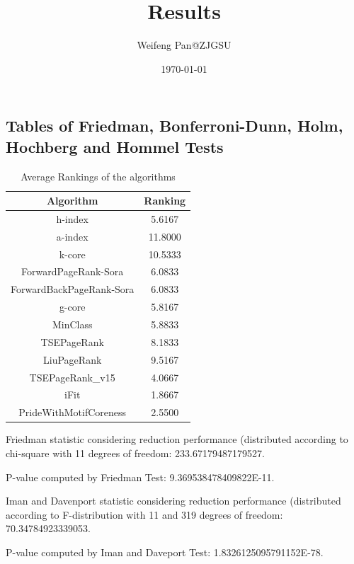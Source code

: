 \documentclass[a4paper,10pt]{article}
\title{Results}
\author{Weifeng Pan@ZJGSU}
\date{\today}
\begin{document}
\begin{landscape}
\oddsidemargin 0in \topmargin 0in\maketitle
\section{Tables of Friedman, Bonferroni-Dunn, Holm, Hochberg and Hommel Tests}
\begin{table}[!htp]
\centering
\caption{Average Rankings of the algorithms
}\begin{tabular}{c|c}
Algorithm&Ranking\\
\hline
h-index&5.6167\\
a-index&11.8000\\
k-core&10.5333\\
ForwardPageRank-Sora&6.0833\\
ForwardBackPageRank-Sora&6.0833\\
g-core&5.8167\\
MinClass&5.8833\\
TSEPageRank&8.1833\\
LiuPageRank&9.5167\\
TSEPageRank_v15&4.0667\\
iFit&1.8667\\
PrideWithMotifCoreness&2.5500\\
\end{tabular}
\end{table}


Friedman statistic considering reduction performance (distributed according to chi-square with 11 degrees of freedom: 233.67179487179527.


P-value computed by Friedman Test: 9.369538478409822E-11.\newline

Iman and Davenport statistic considering reduction performance (distributed according to F-distribution with 11 and 319 degrees of freedom: 70.34784923339053.


P-value computed by Iman and Daveport Test: 1.8326125095791152E-78.\newline


\end{landscape}
\end{document}
